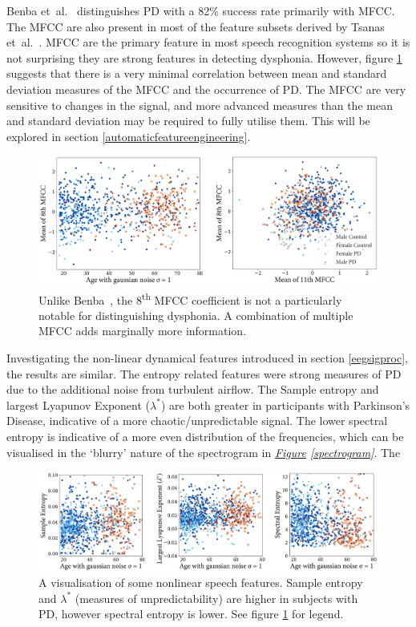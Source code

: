 \documentclass[12pt, twoside]{book}
\begin{document}
Benba et~al.~\cite{benba2014mfcc} distinguishes PD with a 82\% success rate primarily with MFCC. The MFCC are also present in most of the feature subsets derived by Tsanas et~al.~\cite{tsanas2012novel}. MFCC are the primary feature in most speech recognition systems so it is not surprising they are strong features in detecting dysphonia. However, figure \ref{mfcc_feat} suggests that there is a very minimal correlation between mean and standard deviation measures of the MFCC and the occurrence of PD. The MFCC are very sensitive to changes in the signal, and more advanced measures than the mean and standard deviation may be required to fully utilise them. This will be explored in section \ref{automaticfeatureengineering}.


\begin{figure}[h]
	\caption{Unlike Benba~\cite{benba2014mfcc}, the 8\textsuperscript{th} MFCC coefficient is not a particularly notable for distinguishing dysphonia. A combination of multiple MFCC adds marginally more information. }
	\label{mfcc_feat}
	\centering\includegraphics[width=1\linewidth]{mfcc_feat.png}
\end{figure}


Investigating the non-linear dynamical features introduced in section \ref{eegsigproc}, the results are similar. The entropy related features were  strong measures of PD due to the additional noise from turbulent airflow. The Sample entropy and largest Lyapunov Exponent ($\lambda^*$)  are both greater in participants with Parkinson's Disease, indicative of a more chaotic/unpredictable signal. The lower spectral entropy is indicative of a more even distribution of the frequencies, which can be visualised in the `blurry' nature of the spectrogram in \textit{\hyperref[spectrogram]{Figure} \ref{spectrogram}}. The  



\begin{figure}[h]
	\centering
	\centerline{
		\includegraphics[width=1.15\linewidth]{speech_dynamic.png}
	}
	\caption{A visualisation of some nonlinear speech features. Sample entropy and $\lambda^*$ (measures of unpredictability) are higher in subjects with PD, however spectral entropy is lower. See figure \ref{mfcc_feat} for legend.}
	\label{speechdynamic}
\end{figure}
\end{document}
